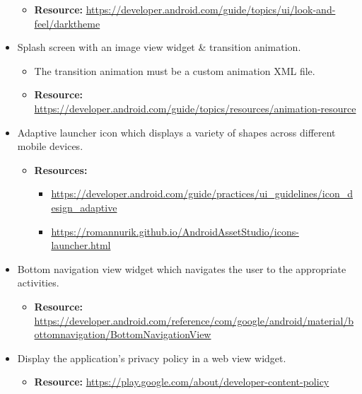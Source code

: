 \documentclass{article}
\begin{document}
\begin{itemize}
\begin{itemize}
        \item \textbf{Resource:} \footnotesize\href{https://developer.android.com/guide/topics/ui/look-and-feel/darktheme}{https://developer.android.com/guide/topics/ui/look-and-feel/darktheme}
    \end{itemize}
    \item Splash screen with an image view widget \& transition animation.
    \begin{itemize}
        \item The transition animation must be a custom animation XML file.
        \item \textbf{Resource:} \footnotesize\href{https://developer.android.com/guide/topics/resources/animation-resource}{https://developer.android.com/guide/topics/resources/animation-resource}
    \end{itemize}
    \item Adaptive launcher icon which displays a variety of shapes across different mobile devices.
    \begin{itemize}
        \item \textbf{Resources:}
        \begin{itemize}
            \item \footnotesize\href{https://developer.android.com/guide/practices/ui\_guidelines/icon\_design\_adaptive}{https://developer.android.com/guide/practices/ui\_guidelines/icon\_design\_adaptive}
            \item \footnotesize\href{https://romannurik.github.io/AndroidAssetStudio/icons-launcher.html}{https://romannurik.github.io/AndroidAssetStudio/icons-launcher.html} 
        \end{itemize}
    \end{itemize}
    \item Bottom navigation view widget which navigates the user to the appropriate activities.
    \begin{itemize}
        \item \textbf{Resource:} \footnotesize\href{https://developer.android.com/reference/com/google/android/material/bottomnavigation/BottomNavigationView}{https://developer.android.com/reference/com/google/android/material/bottomnavigation/BottomNavigationView}
    \end{itemize}
    \item Display the application's privacy policy in a web view widget.
    \begin{itemize}
        \item \textbf{Resource:} \footnotesize\href{https://play.google.com/about/developer-content-policy}{https://play.google.com/about/developer-content-policy}

\end{itemize}
\end{itemize}
\end{document}
